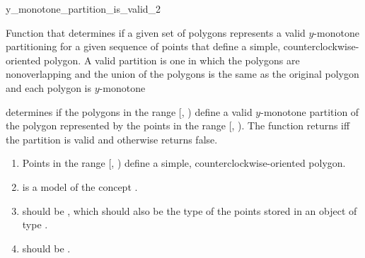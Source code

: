 \renewcommand\ccRefPageBegin{\ccParDims\cgalColumnLayout\begin{ccAdvanced}}
\renewcommand\ccRefPageEnd{\ccParDims\cgalColumnLayout\end{ccAdvanced}}
\begin{ccRefFunction}{y_monotone_partition_is_valid_2}

\ccDefinition
Function that determines if a given set of polygons represents
a valid $y$-monotone partitioning for a given sequence of points that 
define a simple, counterclockwise-oriented polygon.  
A valid partition is one in
which the polygons are nonoverlapping and the union of the polygons is the 
same as the original polygon and each polygon is $y$-monotone


{
determines if the polygons in the range [, )
define a valid $y$-monotone partition of the polygon represented by the points 
in the range [, ). 
The function returns  iff the partition is valid and otherwise
returns false.
}

\begin{enumerate}
    \item Points in the range [, ) define
          a simple, counterclockwise-oriented polygon.
    \item {} is a model of the concept 
          .
    \item {} should be ,
          which should also be the type of the points stored in an object
          of type .
    \item {} should be 
          .
\end{enumerate}


\end{ccRefFunction}
